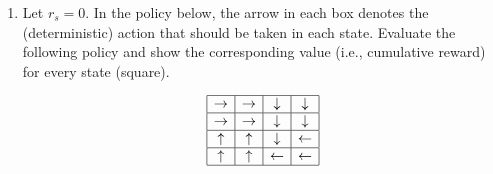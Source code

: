\documentclass[a3paper,12pt]{extarticle} %
\begin{document}
\begin{enumerate}
   \item  Let $r_s = 0$. In the policy below, the arrow in each box denotes the (deterministic) action
    that should be taken in each state. Evaluate the following policy and show the corresponding value
    (i.e., cumulative reward) for every state (square).

    \[
    \begin{array}{|c|c|c|c|}
    \hline
    \rightarrow & \rightarrow & \downarrow & \downarrow \\
    \hline
    \rightarrow & \rightarrow & \downarrow & \downarrow \\
    \hline
    \uparrow & \uparrow & \downarrow & \leftarrow \\
    \hline
    \uparrow & \uparrow & \leftarrow & \leftarrow \\
    \hline
    \end{array}
    \]


\end{enumerate}
\end{document}
